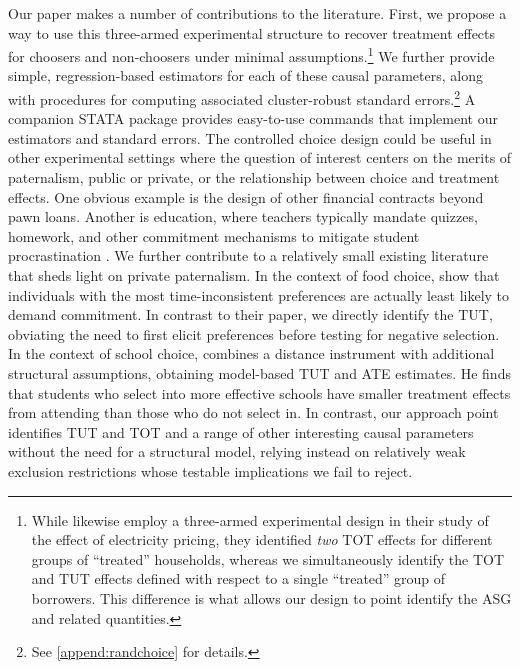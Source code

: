 \documentclass[ecta,nameyear,final]{econsocart}
\begin{document}
Our paper makes a number of contributions to the literature. First, we propose a way to use this three-armed experimental structure to recover treatment effects for choosers and non-choosers under minimal assumptions.\footnote{While \cite{fowlie2021default} likewise employ a three-armed experimental design in their study of the effect of electricity pricing, they identified \emph{two} TOT effects for different groups of ``treated'' households, whereas we simultaneously identify the TOT and TUT effects defined with respect to a single ``treated'' group of borrowers. This difference is what allows our design to point identify the ASG and related quantities.} 
We further provide simple, regression-based estimators for each of these causal parameters, along with procedures for computing associated cluster-robust standard errors.\footnote{See \ref{append:randchoice} for details.} A companion STATA package provides easy-to-use commands that implement our estimators and standard errors. The controlled choice design could be useful in other experimental settings where the question of interest centers on the merits of paternalism, public or private, or the relationship between choice and treatment effects. One obvious example is the design of other financial contracts beyond pawn loans. Another is education, where teachers typically mandate quizzes, homework, and other commitment mechanisms to mitigate student procrastination \citep{Ariely}. 
We further contribute to a relatively small existing literature that sheds light on private paternalism. In the context of food choice, \cite{Sprenger} show that individuals with the most time-inconsistent preferences are actually least likely to demand commitment. In contrast to their paper, we directly identify the TUT, obviating the need to first elicit preferences before testing for negative selection. In the context of school choice, \cite{Walters} combines a distance instrument with additional structural assumptions, obtaining model-based TUT and ATE estimates. He finds that students who select into more effective schools have smaller treatment effects from attending than those who do not select in. In contrast, our approach point identifies TUT and TOT and a range of other interesting causal parameters without the need for a structural model, relying instead on relatively weak exclusion restrictions whose testable implications we fail to reject.
\end{document}
